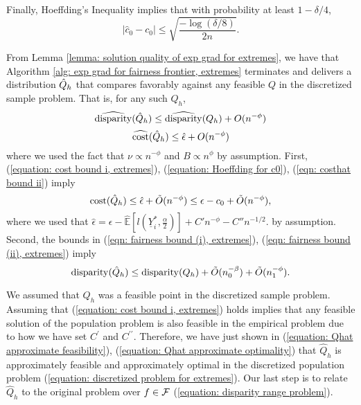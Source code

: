 \documentclass{article}
\begin{document}
Finally, Hoeffding's Inequality implies that with probability at least $1 - \delta/4$,
        \begin{equation}\label{equation: Hoeffding for c0}
            \left| \hat{c}_0 - c_0 \right| \leq \sqrt{ \frac{ -\log(\delta / 8) }{2n} }.
        \end{equation}

From Lemma \ref{lemma: solution quality of exp grad for extremes}, we have that Algorithm \ref{alg: exp grad for fairness frontier, extremes} terminates and delivers a distribution $\hat{Q}_h$ that compares favorably against any feasible $Q$ in the discretized sample problem. That is, for any such $Q_h$, 
        \begin{equation}
            \widehat{\operatorname{disparity}}(\hat{Q}_h) \leq \widehat{\operatorname{disparity}}(Q_h) + O(n^{-\phi})
        \end{equation}
        \begin{equation}
            \widehat{\operatorname{cost}}(\hat{Q}_h) \leq \hat{\epsilon} + O(n^{-\phi}) \label{eqn: costhat bound ii}
        \end{equation}
where we used the fact that $\nu \propto n^{-\phi}$ and $B \propto n^\phi$ by assumption. First, (\ref{equation: cost bound i, extremes}),  (\ref{equation: Hoeffding for c0}), (\ref{eqn: costhat bound ii}) imply
        \begin{equation}\label{equation: Qhat approximate feasibility}
            \operatorname{cost}(\hat{Q}_h) \leq \hat{\epsilon} + \tilde{O}(n^{-\phi}) \leq \epsilon - c_0 + \tilde{O}(n^{-\phi}),
        \end{equation}
where we used that $\hat{\epsilon} = \epsilon - \hat{\mathbb{E}}[l(\underline{Y}^*_i, \frac{\alpha}{2})] + C'n^{-\phi} - C'' n^{-1/2}$. by assumption. Second, the bounds in (\ref{eqn: fairness bound (i), extremes}), (\ref{eqn: fairness bound (ii), extremes}) imply 
        \begin{equation}\label{equation: Qhat approximate optimality}
            \operatorname{disparity}(\hat{Q}_h) \leq \operatorname{disparity}(Q_h) + \tilde{O}(n_0^{-\beta}) + \tilde{O}(n_1^{-\phi}). 
        \end{equation}
    
We assumed that $Q_h$ was a feasible point in the discretized sample problem. Assuming that (\ref{equation: cost bound i, extremes}) holds implies that any feasible solution of the population problem is also feasible in the empirical problem due to how we have set $C^\prime$ and $C^{\prime \prime}$. Therefore, we have just shown in (\ref{equation: Qhat approximate feasibility}), (\ref{equation: Qhat approximate optimality}) that $\hat{Q}_h$  is approximately feasible and approximately optimal in the discretized population problem (\ref{equation: discretized problem for extremes}). Our last step is to relate $\hat{Q}_h$ to the original problem over $f \in \mathcal{F}$ (\ref{equation: disparity range problem}).
    
\end{document}
